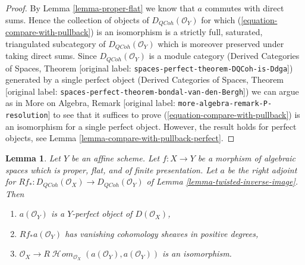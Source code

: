 \documentclass[10pt,a4paper]{article}
\theoremstyle{plain}
\newtheorem{lemma}[subsection]{Lemma}
\theoremstyle{definition}
\theoremstyle{remark}
\numberwithin{equation}{subsection}
\def\SheafHom{\mathop{\mathcal{H}\!\mathit{om}}\nolimits}
\def\QCoh{\mathit{QCoh}}
\begin{document}
\begin{proof}
By Lemma \ref{lemma-proper-flat} we know that $a$ commutes
with direct sums. Hence the collection of objects of
$D_\QCoh(\mathcal{O}_Y)$ for which (\ref{equation-compare-with-pullback})
is an isomorphism is a strictly full, saturated, triangulated
subcategory of $D_\QCoh(\mathcal{O}_Y)$ which is moreover
preserved under taking direct sums. Since $D_\QCoh(\mathcal{O}_Y)$
is a module category (Derived Categories of Spaces, Theorem
\textnormal{[original label: \nolinkurl{spaces-perfect-theorem-DQCoh-is-Ddga}]}) generated by a single
perfect object (Derived Categories of Spaces, Theorem
\textnormal{[original label: \nolinkurl{spaces-perfect-theorem-bondal-van-den-Bergh}]})
we can argue as in
More on Algebra, Remark \textnormal{[original label: \nolinkurl{more-algebra-remark-P-resolution}]}
to see that it suffices to prove (\ref{equation-compare-with-pullback})
is an isomorphism for a single perfect object.
However, the result holds for perfect objects, see
Lemma \ref{lemma-compare-with-pullback-perfect}.
\end{proof}

\begin{lemma}
\label{lemma-properties-relative-dualizing}
Let $Y$ be an affine scheme. Let $f : X \to Y$ be a morphism of
algebraic spaces which is proper, flat, and of finite presentation.
Let $a$ be the right adjoint for
$Rf_* : D_\QCoh(\mathcal{O}_X) \to D_\QCoh(\mathcal{O}_Y)$ of
Lemma \ref{lemma-twisted-inverse-image}.
Then
\begin{enumerate}
\item $a(\mathcal{O}_Y)$ is a $Y$-perfect object of $D(\mathcal{O}_X)$,
\item $Rf_*a(\mathcal{O}_Y)$ has vanishing cohomology sheaves
in positive degrees,
\item $\mathcal{O}_X \to
R\SheafHom_{\mathcal{O}_X}(a(\mathcal{O}_Y), a(\mathcal{O}_Y))$
is an isomorphism.
\end{enumerate}
\end{lemma}
\end{document}

